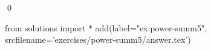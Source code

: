 
\begin{ex} 
  \label{ex:power-summ5}
  
  \qed
\end{ex} 
\begin{python0}
from solutions import *
add(label="ex:power-summ5",
    srcfilename='exercises/power-summ5/answer.tex') 
\end{python0}
